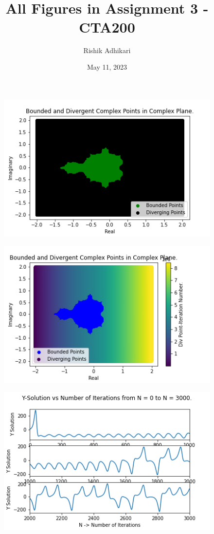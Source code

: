 \documentclass{article}
\title{All Figures in Assignment 3 - CTA200}
\author{Rishik Adhikari}
\date{May 11, 2023}
\begin{document}
\maketitle

\begin{figure}[!htb]
    \centering
    \includegraphics[scale=0.7]{q1_1.png}
    \label{fig:q1_1.png}
\end{figure}
\begin{figure}[!htb]
    \centering
    \includegraphics[scale=0.7]{q1_2.png}
    \label{fig:q1_2.png}
\end{figure}
\begin{figure}[!htb]
    \centering
    \includegraphics[scale=0.7]{q2_1.png}
    \label{fig:q2_1.png}
\end{figure}
\end{document}
